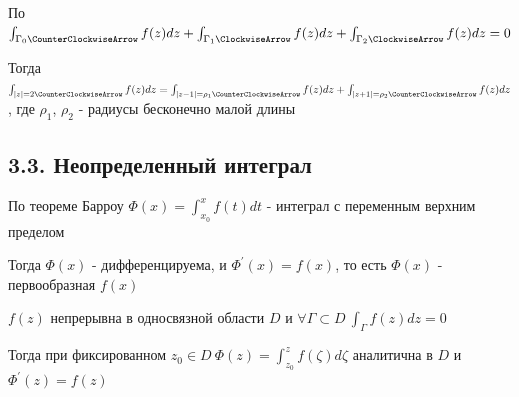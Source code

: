 \documentclass[12pt]{article}
\begin{document}
По  $\int_{\Gamma_0 \CounterClockwiseArrow} f(z) dz + \int_{\Gamma_1 \ClockwiseArrow} f(z) dz + \int_{\Gamma_2 \ClockwiseArrow} f(z) dz = 0$

Тогда $\int_{|z| = 2 \CounterClockwiseArrow} f(z) dz = \int_{|z - 1| = \rho_1 \CounterClockwiseArrow} f(z) dz + \int_{|z + 1| = \rho_2 \CounterClockwiseArrow} f(z) dz$,
где $\rho_1$, $\rho_2$ - радиусы бесконечно малой длины 

\subsection{3.3. Неопределенный интеграл}

\hypertarget{antiderivative}{}

\Mem По теореме Барроу $\Phi(x) = \int_{x_0}^x f(t) dt$ - интеграл с переменным верхним пределом

Тогда $\Phi(x)$ - дифференцируема, и $\Phi^\prime(x) = f(x)$, то есть $\Phi(x)$ - первообразная $f(x)$

\begin{MyTheorem}
    \Ths $f(z)$ непрерывна в односвязной области $D$ и $\forall \Gamma \subset D \ \int_\Gamma f(z) dz = 0$

    Тогда при фиксированном $z_0 \in D \ \Phi(z) = \int_{z_0}^z f(\zeta) d\zeta$ аналитична в $D$ и $\Phi^\prime(z) = f(z)$
\end{MyTheorem}
\end{document}
